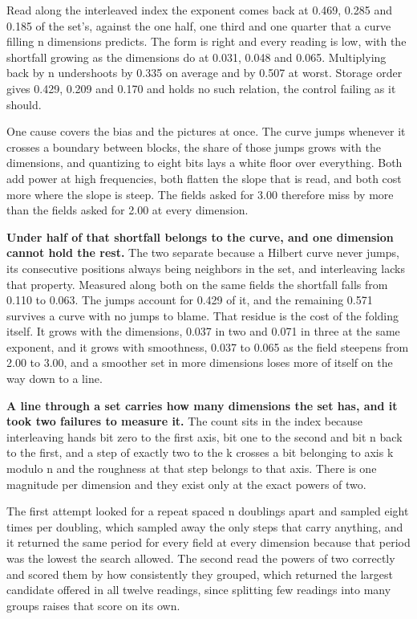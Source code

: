 Read along the interleaved index the exponent comes back at 0.469, 0.285 and 0.185 of the set's, against the one half, one third and one quarter that a curve filling n dimensions predicts. The form is right and every reading is low, with the shortfall growing as the dimensions do at 0.031, 0.048 and 0.065. Multiplying back by n undershoots by 0.335 on average and by 0.507 at worst. Storage order gives 0.429, 0.209 and 0.170 and holds no such relation, the control failing as it should.

One cause covers the bias and the pictures at once. The curve jumps whenever it crosses a boundary between blocks, the share of those jumps grows with the dimensions, and quantizing to eight bits lays a white floor over everything. Both add power at high frequencies, both flatten the slope that is read, and both cost more where the slope is steep. The fields asked for 3.00 therefore miss by more than the fields asked for 2.00 at every dimension.

\textbf{Under half of that shortfall belongs to the curve, and one dimension cannot hold the rest.} The two separate because a Hilbert curve never jumps, its consecutive positions always being neighbors in the set, and interleaving lacks that property. Measured along both on the same fields the shortfall falls from 0.110 to 0.063. The jumps account for 0.429 of it, and the remaining 0.571 survives a curve with no jumps to blame. That residue is the cost of the folding itself. It grows with the dimensions, 0.037 in two and 0.071 in three at the same exponent, and it grows with smoothness, 0.037 to 0.065 as the field steepens from 2.00 to 3.00, and a smoother set in more dimensions loses more of itself on the way down to a line.

\textbf{A line through a set carries how many dimensions the set has, and it took two failures to measure it.} The count sits in the index because interleaving hands bit zero to the first axis, bit one to the second and bit n back to the first, and a step of exactly two to the k crosses a bit belonging to axis k modulo n and the roughness at that step belongs to that axis. There is one magnitude per dimension and they exist only at the exact powers of two.

The first attempt looked for a repeat spaced n doublings apart and sampled eight times per doubling, which sampled away the only steps that carry anything, and it returned the same period for every field at every dimension because that period was the lowest the search allowed. The second read the powers of two correctly and scored them by how consistently they grouped, which returned the largest candidate offered in all twelve readings, since splitting few readings into many groups raises that score on its own.

